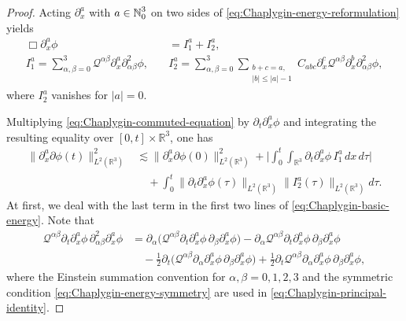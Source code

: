 \documentclass[10pt,a4paper]{amsart}
\def\N{\mathop{\mathbb N\kern 0pt}\nolimits}
\def\cQ{\mathcal Q}
\def\ls{\lesssim}
\begin{document}
	\begin{proof}
		Acting $\partial_x^a$ with $a\in\N_0^3$ on two sides of
		\eqref{eq:Chaplygin-energy-reformulation} yields
		\begin{equation}\label{eq:Chaplygin-commuted-equation}
			\begin{aligned}
				\Box\partial_x^a\phi
				&=
				I_1^a+I_2^a,
				\\
				I_1^a
				=
				\sum_{\alpha,\beta=0}^3
				\cQ^{\alpha\beta}
				\partial_x^a\partial_{\alpha\beta}^2\phi,\quad
				&I_2^a
				=
				\sum_{\alpha,\beta=0}^3
				\sum_{\substack{b+c=a,\\ |b|\le |a|-1}}
				C_{abc}
				\partial_x^c\cQ^{\alpha\beta}
				\partial_x^b\partial_{\alpha\beta}^2\phi,
			\end{aligned}
		\end{equation}
		where $I_2^a$ vanishes for $|a|=0$.
		
		Multiplying \eqref{eq:Chaplygin-commuted-equation} by
		$\partial_t\partial_x^a\phi$ and integrating the resulting equality over
		$[0,t]\times\mathbb R^3$, one has
		\begin{equation}\label{eq:Chaplygin-basic-energy}
			\begin{aligned}
				\|\partial_x^a\partial\phi(t)\|_{L^2(\mathbb R^3)}^2
				&\ls
				\|\partial_x^a\partial\phi(0)\|_{L^2(\mathbb R^3)}^2
				+
				\big|
				\int_0^t\int_{\mathbb R^3}
				\partial_t\partial_x^a\phi\,
				I_1^a\,dx\,d\tau
				\big|
				\\
				&\quad+
				\int_0^t
				\|\partial_t\partial_x^a\phi(\tau)\|_{L^2(\mathbb R^3)}
				\|I_2^a(\tau)\|_{L^2(\mathbb R^3)}
				d\tau.
			\end{aligned}
		\end{equation}
		At first, we deal with the last term in the first two lines of
		\eqref{eq:Chaplygin-basic-energy}. Note that
		\begin{equation}\label{eq:Chaplygin-principal-identity}
			\begin{aligned}
				\cQ^{\alpha\beta}
				\partial_t\partial_x^a\phi\,
				\partial_{\alpha\beta}^2\partial_x^a\phi
				&=
				\partial_\alpha
				\big(
				\cQ^{\alpha\beta}
				\partial_t\partial_x^a\phi\,
				\partial_\beta\partial_x^a\phi
				\big)
				-
				\partial_\alpha\cQ^{\alpha\beta}
				\partial_t\partial_x^a\phi\,
				\partial_\beta\partial_x^a\phi
				\\
				&\quad-
				\frac12\partial_t
				\big(
				\cQ^{\alpha\beta}
				\partial_\alpha\partial_x^a\phi\,
				\partial_\beta\partial_x^a\phi
				\big)
				+
				\frac12\partial_t\cQ^{\alpha\beta}
				\partial_\alpha\partial_x^a\phi\,
				\partial_\beta\partial_x^a\phi,
			\end{aligned}
		\end{equation}
		where the Einstein summation convention for
		$\alpha,\beta=0,1,2,3$ and the symmetric condition
		\eqref{eq:Chaplygin-energy-symmetry} are used in
		\eqref{eq:Chaplygin-principal-identity}.
		

\end{proof}
\end{document}
